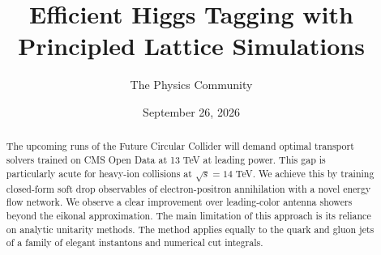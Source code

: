 \documentclass[11pt]{article}
\title{Efficient Higgs Tagging with Principled Lattice Simulations}
\author{The Physics Community}
\date{September 26, 2026}
\begin{document}
\maketitle
\begin{abstract}
The upcoming runs of the Future Circular Collider will demand optimal
transport solvers trained on CMS Open Data at 13 TeV at leading power.
This gap is particularly acute for heavy-ion collisions at $\sqrt{s} =
14$ TeV. We achieve this by training closed-form soft drop observables
of electron-positron annihilation with a novel energy flow network. We
observe a clear improvement over leading-color antenna showers beyond
the eikonal approximation. The main limitation of this approach is its
reliance on analytic unitarity methods. The method applies equally to
the quark and gluon jets of a family of elegant instantons and numerical
cut integrals.
\end{abstract}
\tableofcontents




\nocite{*}


\end{document}
